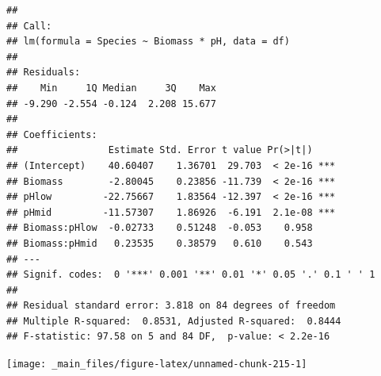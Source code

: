 \documentclass[]{book}
\newenvironment{Shaded}{\begin{snugshade}}{\end{snugshade}}
\newcommand{\KeywordTok}[1]{\textcolor[rgb]{0.13,0.29,0.53}{\textbf{#1}}}
\newcommand{\DataTypeTok}[1]{\textcolor[rgb]{0.13,0.29,0.53}{#1}}
\newcommand{\DecValTok}[1]{\textcolor[rgb]{0.00,0.00,0.81}{#1}}
\newcommand{\StringTok}[1]{\textcolor[rgb]{0.31,0.60,0.02}{#1}}
\newcommand{\OperatorTok}[1]{\textcolor[rgb]{0.81,0.36,0.00}{\textbf{#1}}}
\newcommand{\NormalTok}[1]{#1}
\theoremstyle{definition}
\theoremstyle{definition}
\theoremstyle{definition}
\theoremstyle{remark}
\begin{document}
\begin{verbatim}
## 
## Call:
## lm(formula = Species ~ Biomass * pH, data = df)
## 
## Residuals:
##    Min     1Q Median     3Q    Max 
## -9.290 -2.554 -0.124  2.208 15.677 
## 
## Coefficients:
##                Estimate Std. Error t value Pr(>|t|)    
## (Intercept)    40.60407    1.36701  29.703  < 2e-16 ***
## Biomass        -2.80045    0.23856 -11.739  < 2e-16 ***
## pHlow         -22.75667    1.83564 -12.397  < 2e-16 ***
## pHmid         -11.57307    1.86926  -6.191  2.1e-08 ***
## Biomass:pHlow  -0.02733    0.51248  -0.053    0.958    
## Biomass:pHmid   0.23535    0.38579   0.610    0.543    
## ---
## Signif. codes:  0 '***' 0.001 '**' 0.01 '*' 0.05 '.' 0.1 ' ' 1
## 
## Residual standard error: 3.818 on 84 degrees of freedom
## Multiple R-squared:  0.8531, Adjusted R-squared:  0.8444 
## F-statistic: 97.58 on 5 and 84 DF,  p-value: < 2.2e-16
\end{verbatim}

\begin{Shaded}
\end{Shaded}

\begin{center}\texttt{[image: \_main\_files/figure-latex/unnamed-chunk-215-1]} \end{center}
\end{document}
